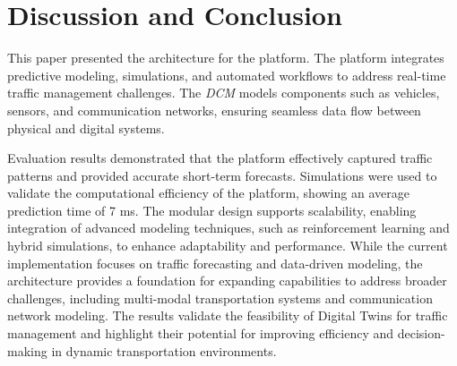 
\section{Discussion and Conclusion}  

This paper presented the architecture for the \digit platform. The platform integrates predictive modeling, simulations, and automated workflows to address real-time traffic management challenges. The \textit{DCM} models components such as vehicles, sensors, and communication networks, ensuring seamless data flow between physical and digital systems.  

Evaluation results demonstrated that the platform effectively captured traffic patterns and provided accurate short-term forecasts. Simulations were used to validate the computational efficiency of the platform, showing an average prediction time of 7 ms. The modular design supports scalability, enabling integration of advanced modeling techniques, such as reinforcement learning and hybrid simulations, to enhance adaptability and performance. While the current implementation focuses on traffic forecasting and data-driven modeling, the architecture provides a foundation for expanding capabilities to address broader challenges, including multi-modal transportation systems and communication network modeling. The results validate the feasibility of Digital Twins for traffic management and highlight their potential for improving efficiency and decision-making in dynamic transportation environments.
